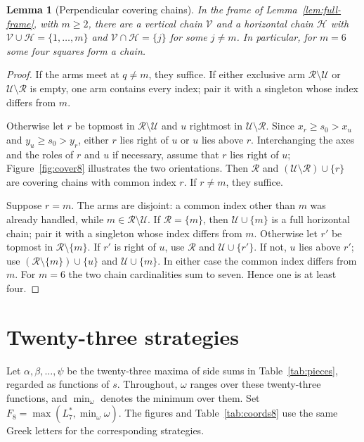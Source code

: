 \documentclass[12pt]{amsart}
\newtheorem{lemma}[theorem]{Lemma}
\theoremstyle{definition}
\theoremstyle{remark}
\numberwithin{equation}{section}
\numberwithin{figure}{section}
\numberwithin{table}{section}
\begin{document}
\begin{lemma}[Perpendicular covering chains]\label{lem:two-cover}
In the frame of Lemma~\ref{lem:full-frame}, with $m\ge2$, there are a
vertical chain $\mathcal V$ and a horizontal chain $\mathcal H$ with
$\mathcal V\cup\mathcal H=\{1,\ldots,m\}$ and
$\mathcal V\cap\mathcal H=\{j\}$ for some $j\ne m$. In particular, for $m=6$ some four squares form a chain.
\end{lemma}
\begin{proof}
If the arms meet at $q\ne m$, they suffice. If either exclusive arm
$\mathcal R\setminus\mathcal U$ or $\mathcal U\setminus\mathcal R$ is empty,
one arm contains every index; pair it with a singleton whose index differs from $m$.

Otherwise let $r$ be topmost in $\mathcal R\setminus\mathcal U$ and $u$
rightmost in $\mathcal U\setminus\mathcal R$. Since $x_r\ge s_0>x_u$ and $y_u\ge s_0>y_r$, either $r$ lies right of $u$ or $u$ lies above $r$. Interchanging the axes
and the roles of $r$ and $u$ if necessary, assume that $r$ lies right of $u$;
Figure~\ref{fig:cover8} illustrates the two orientations.
Then $\mathcal R$ and $(\mathcal U\setminus\mathcal R)\cup\{r\}$
are covering chains with common index $r$. If $r\ne m$, they suffice.

Suppose $r=m$. The arms are disjoint: a common index other than $m$ was
already handled, while $m\in\mathcal R\setminus\mathcal U$.
If $\mathcal R=\{m\}$, then $\mathcal U\cup\{m\}$ is a full horizontal chain;
pair it with a singleton whose index differs from $m$. Otherwise let
$r'$ be topmost in $\mathcal R\setminus\{m\}$. If $r'$ is right of $u$,
use $\mathcal R$ and $\mathcal U\cup\{r'\}$. If not, $u$ lies above $r'$;
use $(\mathcal R\setminus\{m\})\cup\{u\}$ and
$\mathcal U\cup\{m\}$. In either case the common index differs from $m$.
For $m=6$ the two chain cardinalities sum to seven. Hence one is at least four.
\end{proof}

\section{Twenty-three strategies}\label{sec:eight}
Let $\alpha,\beta,\ldots,\psi$ be the twenty-three maxima of side sums in
Table~\ref{tab:pieces}, regarded as functions of $s$. Throughout, $\omega$
ranges over these twenty-three functions, and $\min_\omega$ denotes the minimum
over them. Set $F_8=\max(L_7^*,\min_\omega\omega)$.
The figures and Table~\ref{tab:coords8} use the same Greek letters for the
corresponding strategies.
\end{document}
